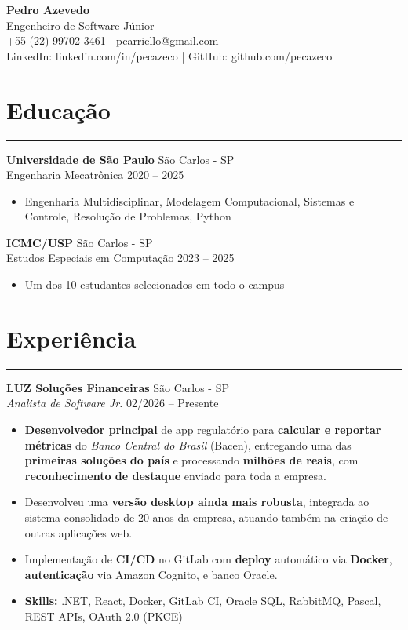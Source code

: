 \documentclass[10pt,a4paper]{article}
\begin{document}
\begin{center}
    {\huge \textbf{Pedro Azevedo}} \\
    Engenheiro de Software Júnior \\
    +55 (22) 99702-3461 \quad | \quad pcarriello@gmail.com \\
    LinkedIn: linkedin.com/in/pecazeco \quad | \quad GitHub: github.com/pecazeco
\end{center}

\section*{Educação}
\hrule \vspace{2mm}
\textbf{Universidade de São Paulo} \hfill São Carlos - SP \\
Engenharia Mecatrônica \hfill 2020 -- 2025
\begin{itemize}[nosep]
    \item Engenharia Multidisciplinar, Modelagem Computacional, Sistemas e Controle, Resolução de Problemas, Python
\end{itemize}

\textbf{ICMC/USP} \hfill São Carlos - SP \\
Estudos Especiais em Computação \hfill 2023 -- 2025
\begin{itemize}[nosep]
    \item Um dos 10 estudantes selecionados em todo o campus
\end{itemize}

\section*{Experiência}
\hrule \vspace{2mm}
\textbf{LUZ Soluções Financeiras} \hfill São Carlos - SP \\
\textit{Analista de Software Jr.} \hfill 02/2026 -- Presente
\begin{itemize}[nosep]
    \item \textbf{Desenvolvedor principal} de app regulatório para \textbf{calcular e reportar métricas} do \textit{Banco Central do Brasil} (Bacen), entregando uma das \textbf{primeiras soluções do país} e processando \textbf{milhões de reais}, com \textbf{reconhecimento de destaque} enviado para toda a empresa.
    \item Desenvolveu uma \textbf{versão desktop ainda mais robusta}, integrada ao sistema consolidado de 20 anos da empresa, atuando também na criação de outras aplicações web.
    \item Implementação de \textbf{CI/CD} no GitLab com \textbf{deploy} automático via \textbf{Docker}, \textbf{autenticação} via Amazon Cognito, e banco Oracle.
    \item \textbf{Skills:} .NET, React, Docker, GitLab CI, Oracle SQL, RabbitMQ, Pascal, REST APIs, OAuth 2.0 (PKCE)
\end{itemize}
\end{document}
